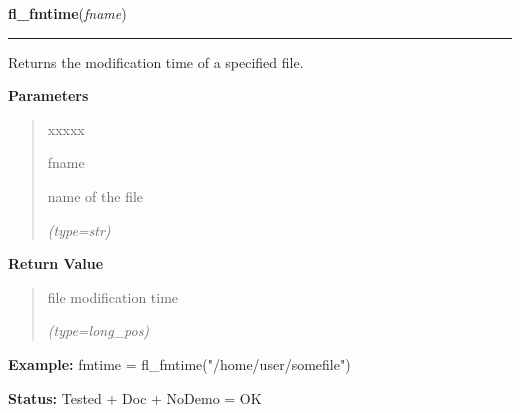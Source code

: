     \vspace{0.5ex}

\hspace{.8\funcindent}\begin{boxedminipage}{\funcwidth}

    \raggedright \textbf{fl\_fmtime}(\textit{fname})

    \vspace{-1.5ex}

    \rule{\textwidth}{0.5\fboxrule}
\setlength{\parskip}{2ex}
    Returns the modification time of a specified file.

\setlength{\parskip}{1ex}
      \textbf{Parameters}
      \vspace{-1ex}

      \begin{quote}
        \begin{Ventry}{xxxxx}

          \item[fname]

          name of the file

            {\it (type=str)}

        \end{Ventry}

      \end{quote}

      \textbf{Return Value}
    \vspace{-1ex}

      \begin{quote}
      file modification time

      {\it (type=long\_pos)}

      \end{quote}

\textbf{Example:} fmtime = fl\_fmtime("/home/user/somefile")



\textbf{Status:} Tested + Doc + NoDemo = OK



    \end{boxedminipage}

    \label{xformslib:flfilesys:fl_fix_dirname}

    \vspace{0.5ex}

